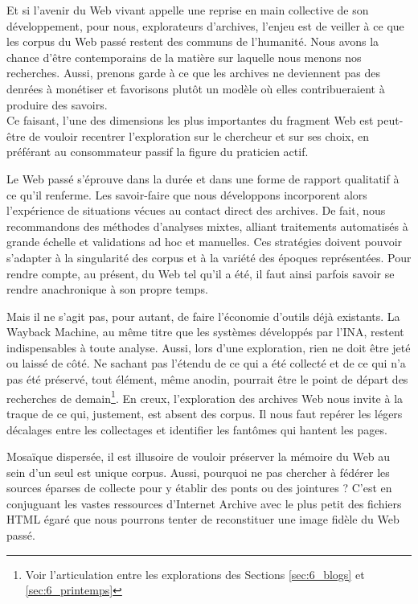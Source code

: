 \documentclass[symmetric,justified,marginals=raggedouter]{tufte-book}
\begin{document}
Et si l'avenir du Web vivant appelle une reprise en main collective de son développement, pour nous, explorateurs d'archives, l'enjeu est de veiller à ce que les corpus du Web passé restent des communs de l'humanité. Nous avons la chance d'être contemporains de la matière sur laquelle nous menons nos recherches. Aussi, prenons garde à ce que les archives ne deviennent pas des denrées à monétiser et favorisons plutôt un modèle où elles contribueraient à produire des savoirs. \\

\noindent Ce faisant, l'une des dimensions les plus importantes du fragment Web est peut-être de vouloir recentrer l'exploration sur le chercheur et sur ses choix, en préférant au consommateur passif la figure du praticien actif. 

Le Web passé s'éprouve dans la durée et dans une forme de rapport qualitatif à ce qu'il renferme. Les savoir-faire que nous développons incorporent alors l'expérience de situations vécues au contact direct des archives. De fait, nous recommandons des méthodes d'analyses mixtes, alliant traitements automatisés à grande échelle et validations ad hoc et manuelles. Ces stratégies doivent pouvoir s'adapter à la singularité des corpus et à la variété des époques représentées. Pour rendre compte, au présent, du Web tel qu'il a été, il faut ainsi parfois savoir se rendre anachronique à son propre temps.

Mais il ne s'agit pas, pour autant, de faire l'économie d'outils déjà existants. La Wayback Machine, au même titre que les systèmes développés par l'INA, restent indispensables à toute analyse. Aussi, lors d'une exploration, rien ne doit être jeté ou laissé de côté. Ne sachant pas l'étendu de ce qui a été collecté et de ce qui n'a pas été préservé, tout élément, même anodin, pourrait être le point de départ des recherches de demain\footnote{\RaggedOuter Voir l'articulation entre les explorations des Sections \ref{sec:6_blogs} et \ref{sec:6_printemps}}. En creux, l'exploration des archives Web nous invite à la traque de ce qui, justement, est absent des corpus. Il nous faut repérer les légers décalages entre les collectages et identifier les fantômes qui hantent les pages.

Mosaïque dispersée, il est illusoire de vouloir préserver la mémoire du Web au sein d'un seul est unique corpus. Aussi, pourquoi ne pas chercher à fédérer les sources éparses de collecte pour y établir des ponts ou des jointures ? C'est en conjuguant les vastes ressources d'Internet Archive avec le plus petit des fichiers HTML égaré que nous pourrons tenter de reconstituer une image fidèle du Web passé. 
\end{document}
